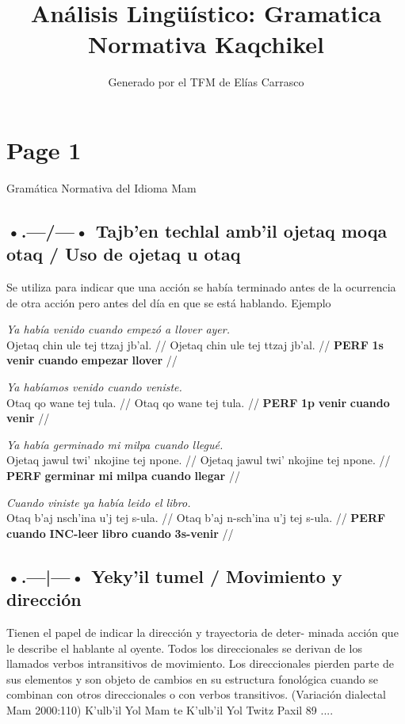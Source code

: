 \documentclass{article}%
\title{Análisis Lingüístico: Gramatica Normativa Kaqchikel}%
\author{Generado por el TFM de Elías Carrasco}%
\begin{document}
%
\normalsize%
\maketitle%
\section{Page 1}%
\label{sec:Page1}%
Gramática Normativa del Idioma Mam %
\subsection{•.—/—• Tajb'en techlal amb'il ojetaq moqa otaq / Uso de ojetaq u otaq}%
\label{subsec:./Tajbentechlalambilojetaqmoqaotaq/Usodeojetaquotaq}%

%
Se utiliza para indicar que una acción se había terminado antes %
de la ocurrencia de otra acción pero antes del día en que se %
está hablando. %
Ejemplo %
\par\medskip%
\ex
\textit{Ya había venido cuando empezó a llover ayer.} \\
\begingl
\gla Ojetaq chin ule tej ttzaj jb'al. //
\glb Ojetaq chin ule tej ttzaj jb'al. //
\glc \textbf{PERF} \textbf{1s} \textbf{venir} \textbf{cuando} \textbf{empezar} \textbf{llover} //
\endgl
\xe
%
\medskip%
\par\medskip%
\ex
\textit{Ya habíamos venido cuando veniste.} \\
\begingl
\gla Otaq qo wane tej tula. //
\glb Otaq qo wane tej tula. //
\glc \textbf{PERF} \textbf{1p} \textbf{venir} \textbf{cuando} \textbf{venir} //
\endgl
\xe
%
\medskip%
\par\medskip%
\ex
\textit{Ya había germinado mi milpa cuando llegué.} \\
\begingl
\gla Ojetaq jawul twi' nkojine tej npone. //
\glb Ojetaq jawul twi' nkojine tej npone. //
\glc \textbf{PERF} \textbf{germinar} \textbf{mi} \textbf{milpa} \textbf{cuando} \textbf{llegar} //
\endgl
\xe
%
\medskip%
\par\medskip%
\ex
\textit{Cuando viniste ya había leido el libro.} \\
\begingl
\gla Otaq b'aj nsch'ina u'j tej s-ula. //
\glb Otaq b'aj n-sch'ina u'j tej s-ula. //
\glc \textbf{PERF} \textbf{cuando} \textbf{INC-}\textbf{leer} \textbf{libro} \textbf{cuando} \textbf{3s-}\textbf{venir} //
\endgl
\xe
%
\medskip%
\subsection{•.—|—• Yeky'il tumel / Movimiento y dirección}%
\label{subsec:.|Yekyiltumel/Movimientoydireccin}%

%
Tienen el papel de indicar la dirección y trayectoria de deter{-} %
minada acción que le describe el hablante al oyente. Todos los %
direccionales se derivan de los llamados verbos intransitivos de %
movimiento. Los direccionales pierden parte de sus elementos %
y son objeto de cambios en su estructura fonológica cuando %
se combinan con otros direccionales o con verbos transitivos. %
(Variación dialectal Mam 2000:110) %
K'ulb'il Yol Mam te K'ulb'il Yol Twitz Paxil 89 .... 

%
\end{document}

